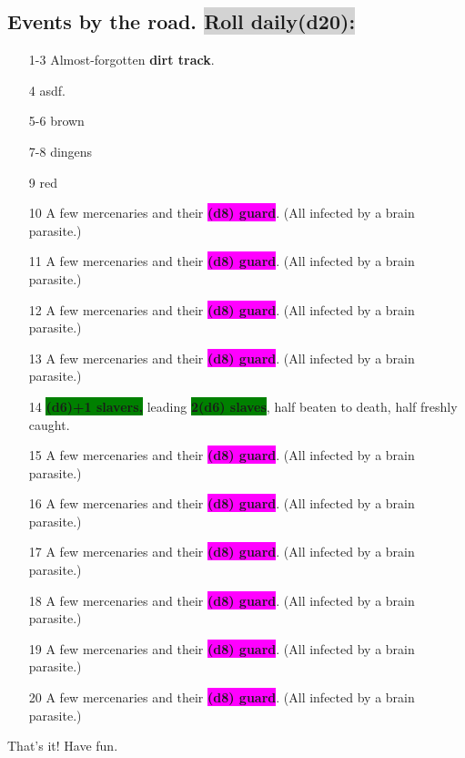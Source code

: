 \documentclass[twoside, a5paper, 9pt, openright]{memoir}
\newcommand{\DSix}[2]{\colorbox{green}{\textbf{#1(d6)#2}}}
\newcommand{\DEight}[2]{\colorbox{magenta}{\textbf{#1(d8)#2}}}
\newcommand{\DTwenty}[2]{\colorbox{lightgray}{\textbf{#1(d20)#2}}}
\begin{document}
\begin{multicols}{2}
	\section{Events by the road. \DTwenty{Roll daily}{:}}
	\begin{enumerate}
		\item[1-3] Almost-forgotten \textbf{dirt track}.
		\item[4] asdf.
		\item[5-6] brown
		\item[7-8] dingens
		\item[9] red
		\item[10] A few mercenaries and their \DEight{}{ guard}. (All infected by a brain parasite.)
		\item[11] A few mercenaries and their \DEight{}{ guard}. (All infected by a brain parasite.)
		\item[12] A few mercenaries and their \DEight{}{ guard}. (All infected by a brain parasite.)
		\item[13] A few mercenaries and their \DEight{}{ guard}. (All infected by a brain parasite.)
		\item[14] \DSix{}{+1 slavers,} leading \DSix{2}{ slaves}, half beaten to death, half freshly caught.
		\item[15] A few mercenaries and their \DEight{}{ guard}. (All infected by a brain parasite.)
		\item[16] A few mercenaries and their \DEight{}{ guard}. (All infected by a brain parasite.)
		\item[17] A few mercenaries and their \DEight{}{ guard}. (All infected by a brain parasite.)
		\item[18] A few mercenaries and their \DEight{}{ guard}. (All infected by a brain parasite.)
		\item[19] A few mercenaries and their \DEight{}{ guard}. (All infected by a brain parasite.)
		\item[20] A few mercenaries and their \DEight{}{ guard}. (All infected by a brain parasite.)
	\end{enumerate}
\end{multicols}
\clearpage

\blindtext[2]


\newpage

\Large That's it! Have fun.

\tableofcontents
\end{document}
